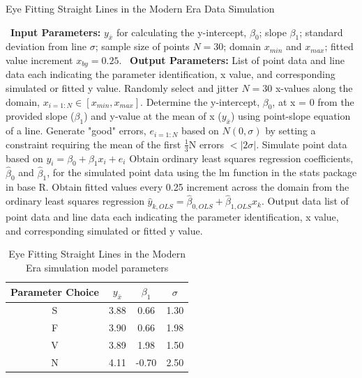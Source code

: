 \documentclass[print]{nuthesis}
\begin{document}
\begin{algorithm}
  \caption{Eye Fitting Straight Lines in the Modern Era Data Simulation}\label{alg:eyefitting-algorithm}
  \begin{algorithmic}[1]
    \Statex \textbullet~\textbf{Input Parameters:} $y_{\bar{x}}$ for calculating the y-intercept, $\beta_0$; slope $\beta_1$; standard deviation from line $\sigma$; sample size of points $N = 30$; domain $x_{min}$ and $x_{max}$; fitted value increment $x_{by} = 0.25$.
    \Statex \textbullet~\textbf{Output Parameters:} List of point data and line data each indicating the parameter identification, x value, and corresponding simulated or fitted y value.
    \State Randomly select and jitter $N = 30$ x-values along the domain, $x_{i=1:N}\in [x_{min}, x_{max}]$.
    \State Determine the y-intercept, $\beta_0$, at x = 0 from the provided slope ($\beta_1$) and y-value at the mean of x ($y_{\bar{x}}$) using point-slope equation of a line.
    \State Generate "good" errors, $e_{i = 1:N}$ based on $N(0,\sigma)$ by setting a constraint requiring the mean of the first $\frac{1}{3}\text{N}$ errors $< |2\sigma|.$
    \State Simulate point data based on $y_i = \beta_0 + \beta_1 x_i + e_i$
    \State Obtain ordinary least squares regression coefficients, $\hat\beta_0$ and $\hat\beta_1$, for the simulated point data using the lm function in the stats package in base R.
    \State Obtain fitted values every 0.25 increment across the domain from the ordinary least squares regression $\hat y_{k,OLS} = \hat\beta_{0,OLS} + \hat\beta_{1,OLS} x_k$.
    \State Output data list of point data and line data each indicating the parameter identification, x value, and corresponding simulated or fitted y value.
  \end{algorithmic}
\end{algorithm}

\begin{table}

\caption{\label{tab:eyefitting-parameters}Eye Fitting Straight Lines in the Modern Era simulation model parameters}
\centering
\begin{tabular}[t]{cccc}
\toprule
Parameter Choice & $y_{\bar{x}}$ & $\beta_1$ & $\sigma$\\
\midrule
S & 3.88 & 0.66 & 1.30\\
F & 3.90 & 0.66 & 1.98\\
V & 3.89 & 1.98 & 1.50\\
N & 4.11 & -0.70 & 2.50\\
\bottomrule
\end{tabular}
\end{table}
\end{document}
